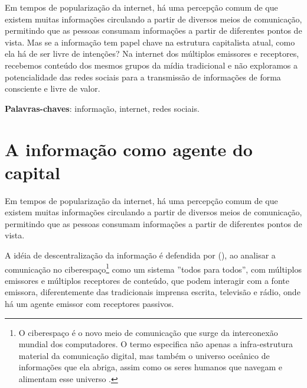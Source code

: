\documentclass[
	article,			%
	12pt,				%
	oneside,			%
	a4paper,			%
	english,			%
	brazil,				%
	]{abntex2}
\begin{document}
\frenchspacing 
\maketitle

\begin{resumoumacoluna}

Em tempos de popularização da internet, há uma percepção comum de que existem muitas informações circulando a partir de diversos meios de comunicação, permitindo que as pessoas consumam informações a partir de diferentes pontos de vista. Mas se a informação tem papel chave na estrutura capitalista atual, como ela há de ser livre de intenções? Na internet dos múltiplos emissores e receptores, recebemos conteúdo dos mesmos grupos da mídia tradicional e não exploramos a potencialidade das redes sociais para a transmissão de informações de forma consciente e livre de valor.
 
 \vspace{\onelineskip}
 
 \noindent
 \textbf{Palavras-chaves}: informação, internet, redes sociais.
\end{resumoumacoluna}

\textual

\section*{A informação como agente do capital}

Em tempos de popularização da internet, há uma percepção comum de que existem muitas informações circulando a partir de diversos meios de comunicação, permitindo que as pessoas consumam informações a partir de diferentes pontos de vista. 

A idéia de descentralização da informação é defendida por  (\citeyear{levy1998}), ao analisar a comunicação no ciberespaço\footnote{O ciberespaço é o novo meio de comunicação que surge da interconexão mundial dos computadores. O termo especifica não apenas a infra-estrutura material da comunicação digital, mas também o universo oceânico de informações que ela abriga, assim como os seres humanos que navegam e alimentam esse universo \cite[p. 17]{levy1999}.} como um sistema ''todos para todos'', com múltiplos emissores e múltiplos receptores de conteúdo, que podem interagir com a fonte emissora, diferentemente das tradicionais imprensa escrita, televisão e rádio, onde há um agente emissor com receptores passivos.
\end{document}
